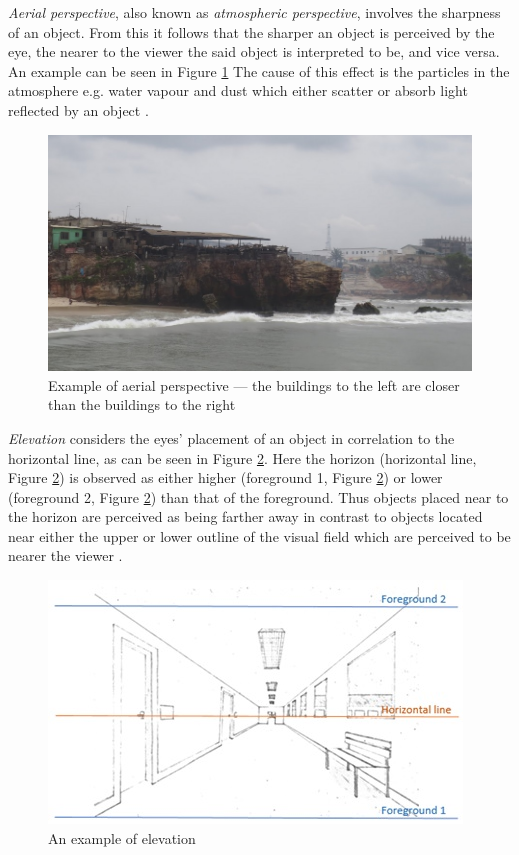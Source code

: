 \textit{Aerial perspective}, also known as \textit{atmospheric perspective},  involves the sharpness of an object. From this it follows that the sharper an object is perceived by the eye, the nearer to the viewer the said object is interpreted to be, and vice versa. An example can be seen in Figure \ref{fig:cue2} The cause of this effect is the particles in the atmosphere e.g. water vapour and dust which either scatter or absorb light reflected by an object \cite{Gale}.  

\begin{figure}[h!]
   \centering
   \includegraphics[width=\textwidth]{figures/cue2.jpg}
   \caption{Example of aerial perspective --- the buildings to the left are closer than the buildings to the right}\label{fig:cue2}
\end{figure}

\pagebreak
\textit{Elevation} considers the eyes' placement of an object in correlation to the horizontal line, as can be seen in Figure \ref{fig:cue3}. Here the horizon (horizontal line, Figure \ref{fig:cue3}) is observed as either higher (foreground 1, Figure \ref{fig:cue3}) or lower  (foreground 2, Figure \ref{fig:cue3}) than that of the foreground. Thus objects placed near to the horizon are perceived as being farther away in contrast to objects located near either the upper or lower outline of the visual field which are perceived to be nearer the viewer \cite{Gale}.   

\begin{figure}[h!]
   \centering
   \includegraphics[scale=0.8]{figures/cue3.jpg}
   \caption{An example of elevation}\label{fig:cue3}
\end{figure}

